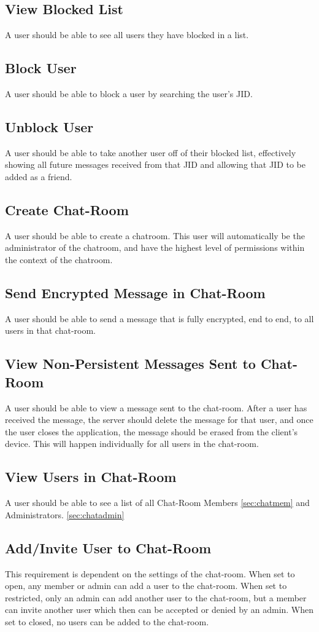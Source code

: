 \documentclass[11pt]{article}
\theoremstyle{plain}
\theoremstyle{definition}
\begin{document}
\subsection{View Blocked List}
A user should be able to see all users they have blocked in a list.
\subsection{Block User}
A user should be able to block a user by searching the user's JID.
\subsection{Unblock User}
A user should be able to take another user off of their blocked list, effectively showing all future messages received from that JID and allowing that JID to be added as a friend.
\subsection{Create Chat-Room}
A user should be able to create a chatroom. This user will automatically be the administrator of the chatroom, and have the highest level of permissions within the context of the chatroom.
\subsection{Send Encrypted Message in Chat-Room}
A user should be able to send a message that is fully encrypted, end to end, to all users in that chat-room.
\subsection{View Non-Persistent Messages Sent to Chat-Room}
A user should be able to view a message sent to the chat-room. After a user has received the message, the server should delete the message for that user, and once the user closes the application, the message should be erased from the client's device. This will happen individually for all users in the chat-room.
\subsection{View Users in Chat-Room}
A user should be able to see a list of all Chat-Room Members \ref{sec:chatmem} and Administrators. \ref{sec:chatadmin}
\subsection{Add/Invite User to Chat-Room}
This requirement is dependent on the settings of the chat-room. When set to open, any member or admin can add a user to the chat-room. When set to restricted, only an admin can add another user to the chat-room, but a member can invite another user which then can be accepted or denied by an admin. When set to closed, no users can be added to the chat-room.
\end{document}
